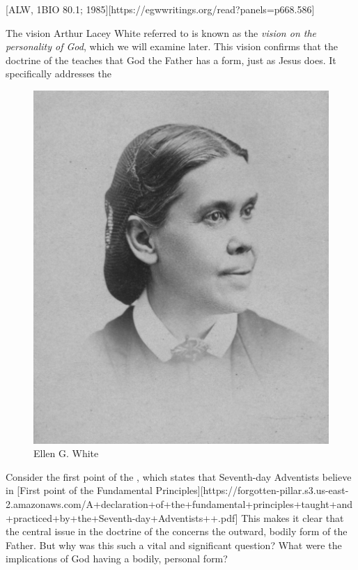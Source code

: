 [ALW, 1BIO 80.1; 1985][https://egwwritings.org/read?panels=p668.586]

The vision Arthur Lacey White referred to is known as the \textit{vision on the personality of God}, which we will examine later. This vision confirms that the doctrine of the  teaches that God the Father has a form, just as Jesus does. It specifically addresses the 

\begin{figure}[t]
    \centering
    \includegraphics[width=0.65\linewidth]{images/ellen-white.jpg}
    \caption*{Ellen G. White}
    \label{fig:ellen-g-white}
\end{figure}

Consider the first point of the , which states that Seventh-day Adventists believe in [First point of the Fundamental Principles][https://forgotten-pillar.s3.us-east-2.amazonaws.com/A+declaration+of+the+fundamental+principles+taught+and+practiced+by+the+Seventh-day+Adventists++.pdf] This makes it clear that the central issue in the doctrine of the  concerns the outward, bodily form of the Father. But why was this such a vital and significant question? What were the implications of God having a bodily, personal form?

